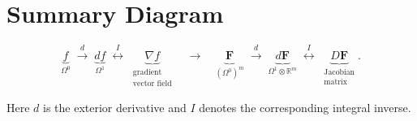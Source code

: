 \documentclass[12pt]{article}
\theoremstyle{definitionstyle}
\newcommand{\R}{\mathbb{R}}
\begin{document}
\section*{Summary Diagram}

\[
\underbrace{f}_{\Omega^0}
\;\xrightarrow{d}\;
\underbrace{df}_{\Omega^1}
\;\overset{I}{\longleftrightarrow}\;
\underbrace{\nabla f}_{\substack{\text{gradient}\\\text{vector field}}}
\quad
\longrightarrow
\quad
\underbrace{\mathbf F}_{(\Omega^0)^m}
\;\xrightarrow{d}\;
\underbrace{d\mathbf F}_{\Omega^1\otimes\R^m}
\;\overset{I}{\longleftrightarrow}\;
\underbrace{D\mathbf F}_{\substack{\text{Jacobian}\\\text{matrix}}}.
\]

Here \(d\) is the exterior derivative and \(I\) denotes the corresponding integral inverse.
\end{document}
